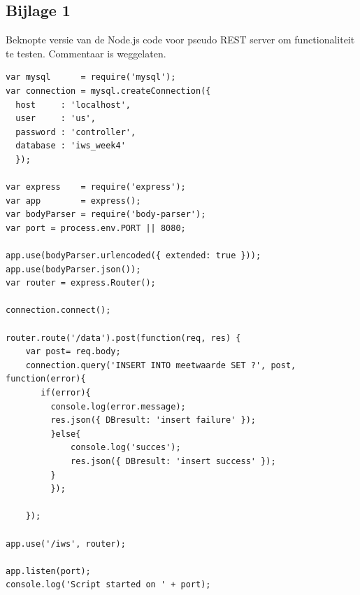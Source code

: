 \documentclass[12pt]{article}
\begin{document}
\subsection*{Bijlage 1}
Beknopte versie van de Node.js code voor pseudo REST server om functionaliteit te testen. Commentaar is weggelaten.
\begin{lstlisting}
var mysql      = require('mysql');
var connection = mysql.createConnection({
  host     : 'localhost',
  user     : 'us',
  password : 'controller',
  database : 'iws_week4'
  });

var express    = require('express');
var app        = express();  
var bodyParser = require('body-parser');
var port = process.env.PORT || 8080;

app.use(bodyParser.urlencoded({ extended: true }));
app.use(bodyParser.json()); 
var router = express.Router(); 

connection.connect();

router.route('/data').post(function(req, res) {
    var post= req.body;
    connection.query('INSERT INTO meetwaarde SET ?', post, function(error){
       if(error){
         console.log(error.message);
         res.json({ DBresult: 'insert failure' });
         }else{
             console.log('succes');
             res.json({ DBresult: 'insert success' });
         }
         });
    
    });

app.use('/iws', router);

app.listen(port);
console.log('Script started on ' + port);
\end{lstlisting}
\end{document}
